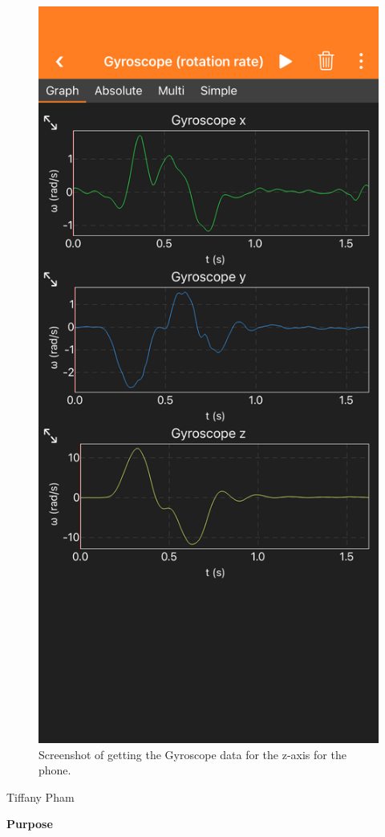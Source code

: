 \documentclass[idxtotoc,hyperref,openany]{labbook} %
\begin{document}
\begin{figure}[H] %
\begin{center}
\includegraphics[width=.7\linewidth]{images/Lab.02/GyroscopeZ.PNG}
\end{center}
\caption{Screenshot of getting the Gyroscope data for the z-axis for the phone.}
\label{fig:Lab02-GyroscopeZ}
\end{figure}


\vspace{-5mm}
\vspace{-5mm}
Tiffany Pham

\textbf{Purpose}
\end{document}
